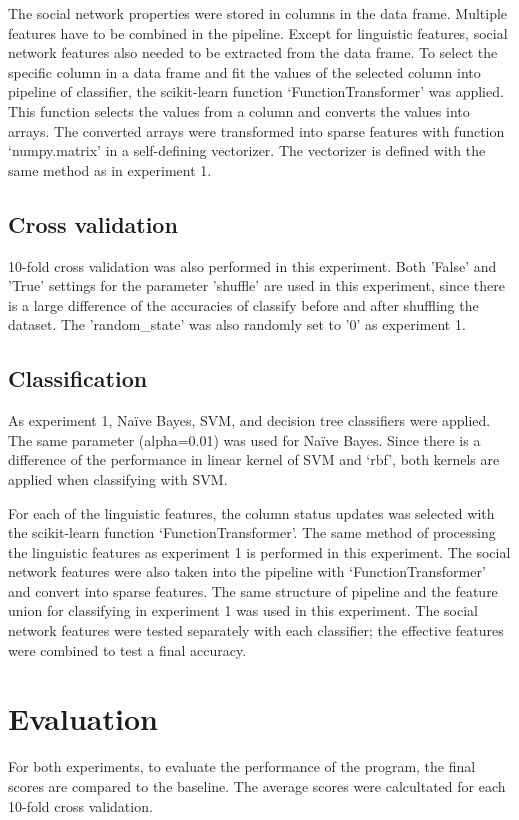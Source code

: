 \documentclass[
10pt, %
a4paper, %
oneside, %
headinclude,footinclude, %
] {book}%
\begin{document}
The social network properties were stored in columns in the data frame. Multiple features have to be combined in the pipeline. Except for linguistic features, social network features also needed to be extracted from the data frame. To select the specific column in a data frame and fit the values of the selected column into pipeline of classifier, the scikit-learn function ‘FunctionTransformer’ was applied. This function selects the values from a column and converts the values into arrays. The converted arrays were transformed into sparse features with function ‘numpy.matrix’ in a self-defining vectorizer. The vectorizer is defined with the same method as in experiment 1.

\subsection{Cross validation}
10-fold cross validation was also performed in this experiment. Both 'False' and 'True' settings for the parameter 'shuffle' are used in this experiment, since there is a large difference of the accuracies of classify before and after shuffling the dataset. The 'random\_state' was also randomly set to '0' as experiment 1.

\subsection{Classification}
As experiment 1, Naïve Bayes, SVM, and decision tree classifiers were applied. The same parameter (alpha=0.01) was used for Naïve Bayes. Since there is a difference of the performance in linear kernel of SVM and ‘rbf’, both kernels are applied when classifying with SVM.

For each of the linguistic features, the column status updates was selected with the scikit-learn function ‘FunctionTransformer’. The same method of processing the linguistic features as experiment 1 is performed in this experiment. The social network features were also taken into the pipeline with ‘FunctionTransformer’ and convert into sparse features. The same structure of pipeline and the feature union for classifying in experiment 1 was used in this experiment. The social network features were tested separately with each classifier; the effective features were combined to test a final accuracy.


\section{Evaluation}
For both experiments, to evaluate the performance of the program, the final scores are compared to the baseline. The average scores were calcultated for each 10-fold cross validation.
\end{document}
